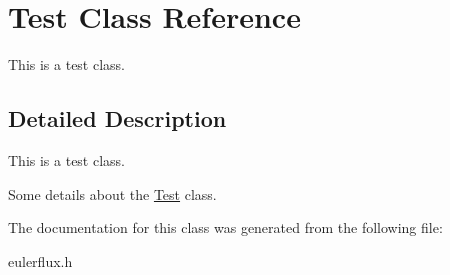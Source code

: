 \hypertarget{classTest}{}\section{Test Class Reference}
\label{classTest}


This is a test class.  




\subsection{Detailed Description}
This is a test class. 

Some details about the \hyperlink{classTest}{Test} class. 

The documentation for this class was generated from the following file\+:\begin{DoxyCompactItemize}
\item 
eulerflux.\+h\end{DoxyCompactItemize}
